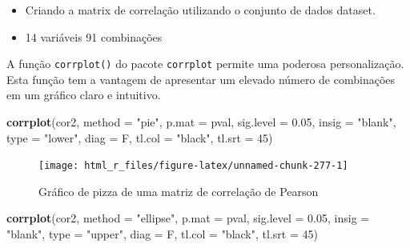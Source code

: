\documentclass[
]{book}
\newenvironment{Shaded}{\begin{snugshade}}{\end{snugshade}}
\newcommand{\DataTypeTok}[1]{\textcolor[rgb]{0.13,0.29,0.53}{#1}}
\newcommand{\DecValTok}[1]{\textcolor[rgb]{0.00,0.00,0.81}{#1}}
\newcommand{\FloatTok}[1]{\textcolor[rgb]{0.00,0.00,0.81}{#1}}
\newcommand{\KeywordTok}[1]{\textcolor[rgb]{0.13,0.29,0.53}{\textbf{#1}}}
\newcommand{\NormalTok}[1]{#1}
\newcommand{\OperatorTok}[1]{\textcolor[rgb]{0.81,0.36,0.00}{\textbf{#1}}}
\newcommand{\StringTok}[1]{\textcolor[rgb]{0.31,0.60,0.02}{#1}}
\providecommand{\tightlist}{%
  \setlength{\itemsep}{0pt}\setlength{\parskip}{0pt}}
\begin{document}
\begin{itemize}
\tightlist
\item
  Criando a matrix de correlação utilizando o conjunto de dados dataset.
\item
  14 variáveis \textbar{} 91 combinações
\end{itemize}

\begin{Shaded}
\end{Shaded}

A função \texttt{corrplot()}  do pacote \texttt{corrplot} permite uma poderosa personalização. Esta função tem a vantagem de apresentar um elevado número de combinações em um gráfico claro e intuitivo.

\begin{Shaded}
\begin{Highlighting}[]
\KeywordTok{corrplot}\NormalTok{(cor2,}
         \DataTypeTok{method =} \StringTok{"pie"}\NormalTok{,}
         \DataTypeTok{p.mat =}\NormalTok{ pval,}
         \DataTypeTok{sig.level =} \FloatTok{0.05}\NormalTok{,}
         \DataTypeTok{insig =} \StringTok{"blank"}\NormalTok{,}
         \DataTypeTok{type =} \StringTok{"lower"}\NormalTok{,}
         \DataTypeTok{diag =}\NormalTok{ F,}
         \DataTypeTok{tl.col =} \StringTok{"black"}\NormalTok{,}
         \DataTypeTok{tl.srt =} \DecValTok{45}\NormalTok{)}
\end{Highlighting}
\end{Shaded}

\begin{figure}

{\centering \texttt{[image: html\_r\_files/figure-latex/unnamed-chunk-277-1]} 

}

\caption{Gráfico de pizza de uma matriz de correlação de Pearson}\label{fig:unnamed-chunk-277}
\end{figure}

\begin{Shaded}
\begin{Highlighting}[]
\KeywordTok{corrplot}\NormalTok{(cor2,}
         \DataTypeTok{method =} \StringTok{"ellipse"}\NormalTok{,}
         \DataTypeTok{p.mat =}\NormalTok{ pval,}
         \DataTypeTok{sig.level =} \FloatTok{0.05}\NormalTok{,}
         \DataTypeTok{insig =} \StringTok{"blank"}\NormalTok{,}
         \DataTypeTok{type =} \StringTok{"upper"}\NormalTok{,}
         \DataTypeTok{diag =}\NormalTok{ F,}
         \DataTypeTok{tl.col =} \StringTok{"black"}\NormalTok{,}
         \DataTypeTok{tl.srt =} \DecValTok{45}\NormalTok{)}
\end{Highlighting}
\end{Shaded}
\end{document}
